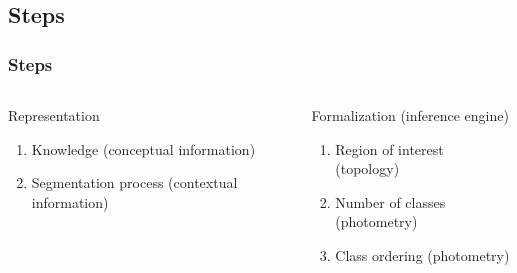 	\subsection[Steps]{Steps}	%
		\begin{frame}
			\frametitle{Steps}
					\begin{columns}[c]
						\column{24em}
							\begin{block}{Representation}
								\begin{enumerate}
									\item Knowledge (conceptual information)
									\item Segmentation process (contextual information)
								\end{enumerate}		
							\end{block}							
							\begin{block}{Formalization (inference engine)}
								\begin{enumerate}
									\item Region of interest (topology)
									\item Number of classes (photometry)
									\item Class ordering (photometry)
								\end{enumerate}		
							\end{block}											
						
					\end{columns}


\end{frame}
